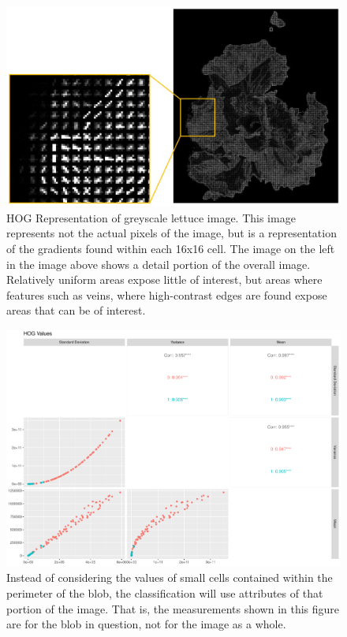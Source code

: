\documentclass[letterpaper]{report}
\begin{document}
\begin{figure}[H]
	\centering
	\includegraphics[width=0.4\linewidth]{./figures/hog.jpg}
	\caption[HOG Representation of Lettuce]{HOG Representation of greyscale lettuce image. This image represents not the actual pixels of the image, but is a representation of the gradients found within each 16x16 cell. The image on the left in the image above shows a detail portion of the overall image. Relatively uniform areas expose little of interest, but areas where features such as veins, where high-contrast edges are found expose areas that can be of interest.}
	\label{fig:hog}
\end{figure}

\begin{figure}[h!]
	\centering
	\includegraphics[width=0.7\linewidth]{./figures/hog-pairs.pdf}
	\caption[HOG features used in classification]{Instead of considering the values of small cells contained within the perimeter of the blob, the classification will use attributes of that portion of the image. That is, the measurements shown in this figure are for the blob in question, not for the image as a whole.}
	\label{fig:hog-pairs}
\end{figure}


%
%
\end{document}
